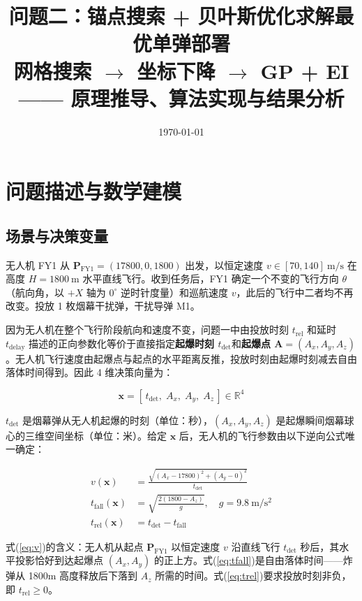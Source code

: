 \documentclass[12pt,a4paper]{ctexart}
\title{\textbf{问题二：锚点搜索 + 贝叶斯优化求解最优单弹部署}\\[5pt]
       \large 网格搜索 $\to$ 坐标下降 $\to$ GP + EI —— 原理推导、算法实现与结果分析}
\author{}
\date{\today}
\newcommand{\tdet}{t_{\text{det}}}
\newcommand{\R}{\mathbb{R}}
\begin{document}
\maketitle

\section{问题描述与数学建模}

\subsection{场景与决策变量}

无人机 FY1 从 $\mathbf{P}_{\text{FY1}} = (17800, 0, 1800)$ 出发，以恒定速度 $v \in [70, 140]\ \mathrm{m/s}$ 在高度 $H = 1800\ \mathrm{m}$ 水平直线飞行。收到任务后，FY1 确定一个不变的飞行方向 $\theta$（航向角，以 $+X$ 轴为 $0^\circ$ 逆时针度量）和巡航速度 $v$，此后的飞行中二者均不再改变。投放 1 枚烟幕干扰弹，干扰导弹 M1。

因为无人机在整个飞行阶段航向和速度不变，问题一中由投放时刻 $t_{\text{rel}}$ 和延时 $t_{\text{delay}}$ 描述的正向参数化等价于直接指定\textbf{起爆时刻 $\tdet$}和\textbf{起爆点 $\mathbf{A} = (A_x, A_y, A_z)$}。无人机飞行速度由起爆点与起点的水平距离反推，投放时刻由起爆时刻减去自由落体时间得到。因此 4 维决策向量为：

\begin{equation}
\boxed{\mathbf{x} = [\,\tdet,\; A_x,\; A_y,\; A_z\,] \in \R^4}
\end{equation}

$\tdet$ 是烟幕弹从无人机起爆的时刻（单位：秒），$(A_x, A_y, A_z)$ 是起爆瞬间烟幕球心的三维空间坐标（单位：米）。给定 $\mathbf{x}$ 后，无人机的飞行参数由以下逆向公式唯一确定：

\begin{align}
v(\mathbf{x}) &= \frac{\sqrt{(A_x - 17800)^2 + (A_y - 0)^2}}{\tdet} \label{eq:v} \\
t_{\text{fall}}(\mathbf{x}) &= \sqrt{\frac{2(1800 - A_z)}{g}}, \quad g = 9.8\ \mathrm{m/s^2} \label{eq:tfall} \\
t_{\text{rel}}(\mathbf{x}) &= \tdet - t_{\text{fall}} \label{eq:trel}
\end{align}

式(\ref{eq:v})的含义：无人机从起点 $\mathbf{P}_{\text{FY1}}$ 以恒定速度 $v$ 沿直线飞行 $\tdet$ 秒后，其水平投影恰好到达起爆点 $(A_x, A_y)$ 的正上方。式(\ref{eq:tfall})是自由落体时间——炸弹从 1800m 高度释放后下落到 $A_z$ 所需的时间。式(\ref{eq:trel})要求投放时刻非负，即 $t_{\text{rel}} \geq 0$。
\end{document}
